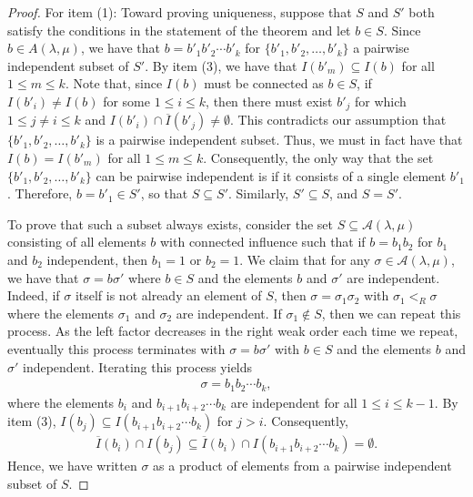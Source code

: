 \documentclass{amsart}
\theoremstyle{definition}
\newcommand{\calA}{\mathcal{A}}
\begin{document}
\begin{proof}

    For item (1): Toward proving uniqueness, suppose that $S$ and $S'$ both satisfy the conditions in the statement of the theorem and let $b\in S$. 
    Since $b\in A(\lambda,\mu)$, we have that $b=b'_1b'_2\cdots b'_k$ for $\{b'_1,b'_2,\ldots,b'_k\}$ a pairwise independent subset of $S'$. By  item (3), we have that $I(b'_m)\subseteq I(b)$ for all $1\leq m\leq k$. 
    Note that, since $I(b)$ must be connected as $b\in S$, if $I(b'_i)\neq I(b)$ for some $1\leq i\leq k$, then there must exist $b'_j$ for which $1\le j\neq i\le k$ and $I(b'_i)\cap \overline{I}(b'_j)\neq \emptyset$. 
    This contradicts our assumption that $\{b'_1,b'_2,\ldots,b'_k\}$ is a pairwise independent subset. 
    Thus, we must in fact have that $I(b)=I(b'_m)$ for all $1\leq m\leq k$. 
    Consequently, the only way that the set $\{b'_1,b'_2,\ldots,b'_k\}$ can be pairwise independent is if it consists of a single element $b'_1$. 
    Therefore, $b=b'_1\in S'$, so that $S\subseteq S'$. Similarly, $S'\subseteq S$, and $S=S'$.
    
    
    

    To prove that such a subset always exists, consider the set $S\subseteq \calA(\lambda,\mu)$ consisting of all elements $b$ with connected influence such that if $b=b_1b_2$ for $b_1$ and $b_2$ independent, then $b_1=1$ or $b_2=1$. 
    We claim that for any $\sigma\in \calA(\lambda,\mu)$, we have that $\sigma=b\sigma'$ where $b\in S$ and the elements $b$ and $\sigma'$ are independent. 
    Indeed, if $\sigma$ itself is not already an element of $S$, then $\sigma=\sigma_1\sigma_2$ with $\sigma_1<_R\sigma$ where the elements $\sigma_1$ and $\sigma_2$ are independent. If $\sigma_1\notin S$, then we can repeat this process. As the left factor decreases in the right weak order each time we repeat, eventually this process terminates with $\sigma = b\sigma'$ with $b\in S$ and the elements $b$ and $\sigma'$ independent. Iterating this process yields 
    \begin{align*}
\sigma=b_1b_2\cdots b_k,
    \end{align*} where the elements $b_i$ and $b_{i+1}b_{i+2}\cdots b_k$ are independent for all $1\leq i\leq k-1$. 
    By  item (3), $I(b_j)\subseteq I(b_{i+1}b_{i+2}\cdots b_k)$ for $j>i$.
    Consequently, 
    \begin{align*}
        \overline{I}(b_i)\cap{I}(b_j)\subseteq \overline{I}(b_i)\cap I(b_{i+1}b_{i+2}\cdots b_k)=\emptyset.
    \end{align*} Hence, we have written $\sigma$ as a product of elements from a pairwise independent subset of $S$.


\end{proof}
\end{document}

